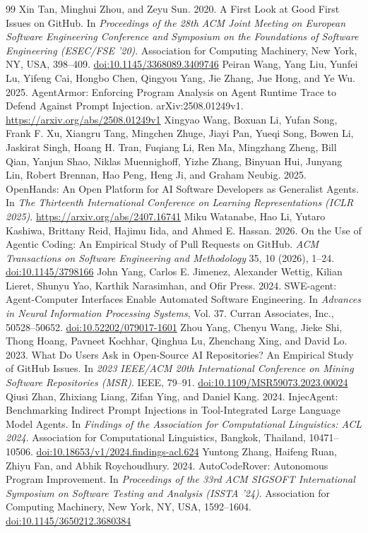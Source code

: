 \documentclass[acmsmall,screen,nonacm,review]{acmart}
\providecommand{\doi}[1]{\href{https://doi.org/#1}{doi:#1}}
\begin{document}
\begin{thebibliography}{99}
 Xin Tan, Minghui Zhou, and Zeyu Sun. 2020. A First Look at Good First Issues on GitHub. In \emph{Proceedings of the 28th ACM Joint Meeting on European Software Engineering Conference and Symposium on the Foundations of Software Engineering (ESEC/FSE '20)}. Association for Computing Machinery, New York, NY, USA, 398--409. \doi{10.1145/3368089.3409746}
 Peiran Wang, Yang Liu, Yunfei Lu, Yifeng Cai, Hongbo Chen, Qingyou Yang, Jie Zhang, Jue Hong, and Ye Wu. 2025. AgentArmor: Enforcing Program Analysis on Agent Runtime Trace to Defend Against Prompt Injection. arXiv:2508.01249v1. \url{https://arxiv.org/abs/2508.01249v1}
 Xingyao Wang, Boxuan Li, Yufan Song, Frank F. Xu, Xiangru Tang, Mingchen Zhuge, Jiayi Pan, Yueqi Song, Bowen Li, Jaskirat Singh, Hoang H. Tran, Fuqiang Li, Ren Ma, Mingzhang Zheng, Bill Qian, Yanjun Shao, Niklas Muennighoff, Yizhe Zhang, Binyuan Hui, Junyang Lin, Robert Brennan, Hao Peng, Heng Ji, and Graham Neubig. 2025. OpenHands: An Open Platform for AI Software Developers as Generalist Agents. In \emph{The Thirteenth International Conference on Learning Representations (ICLR 2025)}. \url{https://arxiv.org/abs/2407.16741}
 Miku Watanabe, Hao Li, Yutaro Kashiwa, Brittany Reid, Hajimu Iida, and Ahmed E. Hassan. 2026. On the Use of Agentic Coding: An Empirical Study of Pull Requests on GitHub. \emph{ACM Transactions on Software Engineering and Methodology} 35, 10 (2026), 1--24. \doi{10.1145/3798166}
 John Yang, Carlos E. Jimenez, Alexander Wettig, Kilian Lieret, Shunyu Yao, Karthik Narasimhan, and Ofir Press. 2024. SWE-agent: Agent-Computer Interfaces Enable Automated Software Engineering. In \emph{Advances in Neural Information Processing Systems}, Vol. 37. Curran Associates, Inc., 50528--50652. \doi{10.52202/079017-1601}
 Zhou Yang, Chenyu Wang, Jieke Shi, Thong Hoang, Pavneet Kochhar, Qinghua Lu, Zhenchang Xing, and David Lo. 2023. What Do Users Ask in Open-Source AI Repositories? An Empirical Study of GitHub Issues. In \emph{2023 IEEE/ACM 20th International Conference on Mining Software Repositories (MSR)}. IEEE, 79--91. \doi{10.1109/MSR59073.2023.00024}
 Qiusi Zhan, Zhixiang Liang, Zifan Ying, and Daniel Kang. 2024. InjecAgent: Benchmarking Indirect Prompt Injections in Tool-Integrated Large Language Model Agents. In \emph{Findings of the Association for Computational Linguistics: ACL 2024}. Association for Computational Linguistics, Bangkok, Thailand, 10471--10506. \doi{10.18653/v1/2024.findings-acl.624}
 Yuntong Zhang, Haifeng Ruan, Zhiyu Fan, and Abhik Roychoudhury. 2024. AutoCodeRover: Autonomous Program Improvement. In \emph{Proceedings of the 33rd ACM SIGSOFT International Symposium on Software Testing and Analysis (ISSTA '24)}. Association for Computing Machinery, New York, NY, USA, 1592--1604. \doi{10.1145/3650212.3680384}
\end{thebibliography}
\endgroup



\clearpage

\end{document}
